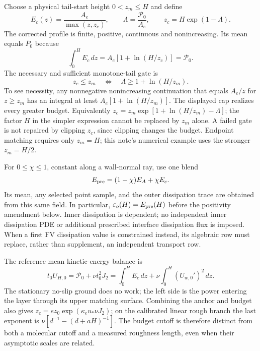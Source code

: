 \documentclass[11pt,a4paper]{article}
\numberwithin{equation}{section}
\begin{document}
Choose a physical tail-start height $0<z_m\leq H$ and define
\begin{equation}
 E_c(z)=\frac{A_e}{\max(z,z_c)},\qquad
 \Lambda=\frac{\mathcal P_0}{A_e},\qquad
 \boxed{z_c=H\exp(1-\Lambda).}
 \label{eq:wj-wall-cutoff}
\end{equation}
The corrected profile is finite, positive, continuous and nonincreasing.
Its mean equals $\overline P_0$ because
\begin{equation}
 \int_0^H E_c\,dz=A_e[1+\ln(H/z_c)]=\mathcal P_0.
 \label{eq:wj-wall-cutoff-budget}
\end{equation}
The necessary and sufficient monotone-tail gate is
\begin{equation}
 \boxed{z_c\leq z_m\quad\Longleftrightarrow\quad
 \Lambda\geq1+\ln(H/z_m).}
 \label{eq:wj-wall-cutoff-gate}
\end{equation}
To see necessity, any nonnegative nonincreasing continuation that equals
$A_e/z$ for $z\geq z_m$ has an integral at least
$A_e[1+\ln(H/z_m)]$. The displayed cap realizes every greater budget.
Equivalently $z_c=z_m\exp[1+\ln(H/z_m)-\Lambda]$; the factor $H$ in
the simpler expression cannot be replaced by $z_m$ alone. A failed gate
is not repaired by clipping $z_c$, since clipping changes the budget.
Endpoint matching requires only $z_m=H$; this note's numerical example
uses the stronger $z_m=H/2$.

For $0\leq\chi\leq1$, constant along a wall-normal ray, use one blend
\begin{equation}
 E_{\rm pre}=(1-\chi)E_A+\chi E_c.
 \label{eq:wj-wall-blend}
\end{equation}
Its mean, any selected point sample, and the outer dissipation trace
are obtained from this same field. In particular,
$\varepsilon_o(H)=E_{\rm pre}(H)$ before the positivity amendment below.
Inner dissipation is dependent; no independent inner dissipation PDE or
additional prescribed interface dissipation flux is imposed. When a
first FV dissipation value is constrained instead, its algebraic row
must replace, rather than supplement, an independent transport row.

The reference mean kinetic-energy balance is
\begin{equation}
 t_0U_{H,0}=\mathcal P_0+\nu t_0^2J_2
 =\int_0^H E_c\,dz+\nu\int_0^H(U_{w,0}')^2\,dz.
 \label{eq:wj-wall-energy}
\end{equation}
The stationary no-slip ground does no work; the left side is the power
entering the layer through its upper matching surface.
Combining the anchor and budget also gives
$z_c=e z_0\exp(\kappa_e u_*\nu J_2)$; on the calibrated linear rough
branch the last exponent is $\nu[d^{-1}-(d+aH)^{-1}]$. The budget
cutoff is therefore distinct from both a molecular cutoff and a
measured roughness length, even when their asymptotic scales are related.
\end{document}
